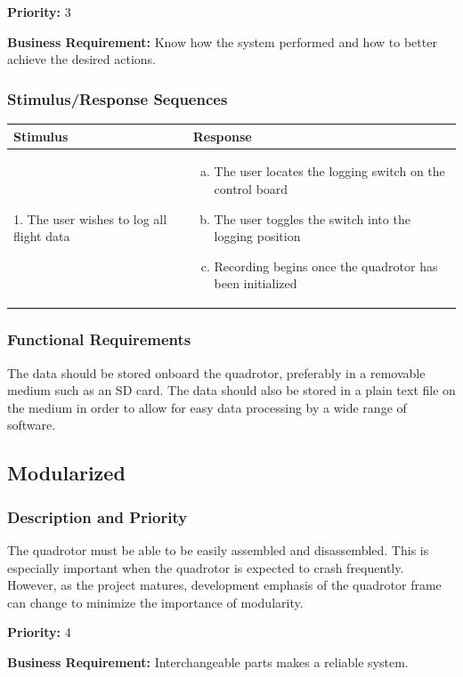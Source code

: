\documentclass[english]{article}
\numberwithin{equation}{section} %
\begin{document}
\textbf{Priority:} 3

\textbf{Business Requirement:} Know how the system performed and how to better achieve the desired actions.

\subsubsection{Stimulus/Response Sequences}

\begin{tabular}{p{3cm} | p{8.5cm}}
\hline
\textbf{Stimulus} & \textbf{Response}\\
\hline
1. The user wishes to log all flight data &
\begin{enumerate}[(a)]\itemsep1pt %
\item The user locates the logging switch on the control board
\item The user toggles the switch into the logging position
\item Recording begins once the quadrotor has been initialized
\end{enumerate}
\\ 
\hline
\end{tabular}
\subsubsection{Functional Requirements}
The data should be stored onboard the quadrotor, preferably in a removable medium such as an SD card. The data should also be stored in a plain text file on the medium in order to allow for easy data processing by a wide range of software.
\bigskip

\subsection{Modularized} 
\subsubsection{Description and Priority}
The quadrotor must be able to be easily assembled and disassembled. This is especially important when the quadrotor is expected to crash frequently. However, as the project matures, development emphasis of the quadrotor frame can change to minimize the importance of modularity.

\textbf{Priority:} 4

\textbf{Business Requirement:} Interchangeable parts makes a reliable system.
\end{document}
